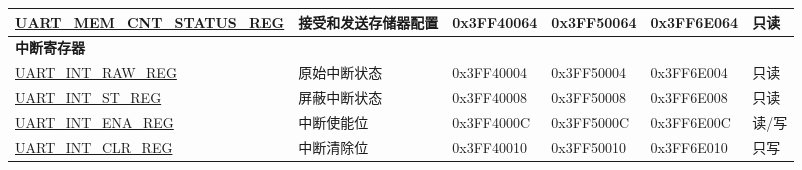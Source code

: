 \begin{longtable}{ | p{4.9cm} | p{3.6cm} | p{1.9cm} | p{1.9cm} | p{1.9cm} | p{0.8cm} | }
\hyperref[regdesc:UARTMEMCNTSTATUSREG]{UART\_MEM\_CNT\_STATUS\_REG} & 接受和发送存储器配置 & {0x3FF40064} & {0x3FF50064} & {0x3FF6E064} & {只读} \\ \hline
\multicolumn{6}{|l|}{\textbf{中断寄存器}} \\ \hline
\hyperref[regdesc:UARTINTRAWREG]{UART\_INT\_RAW\_REG} & 原始中断状态 & 0x3FF40004 & 0x3FF50004 & 0x3FF6E004 & 只读 \\ \hline
\hyperref[regdesc:UARTINTSTREG]{UART\_INT\_ST\_REG} & 屏蔽中断状态 & {0x3FF40008} & {0x3FF50008} & {0x3FF6E008} & {只读} \\ \hline
\hyperref[regdesc:UARTINTENAREG]{UART\_INT\_ENA\_REG} & 中断使能位 & 0x3FF4000C & 0x3FF5000C & 0x3FF6E00C & 读/写 \\ \hline
\hyperref[regdesc:UARTINTCLRREG]{UART\_INT\_CLR\_REG} & 中断清除位 & 0x3FF40010 & 0x3FF50010 & 0x3FF6E010 & 只写 \\ \hline
\end{longtable}